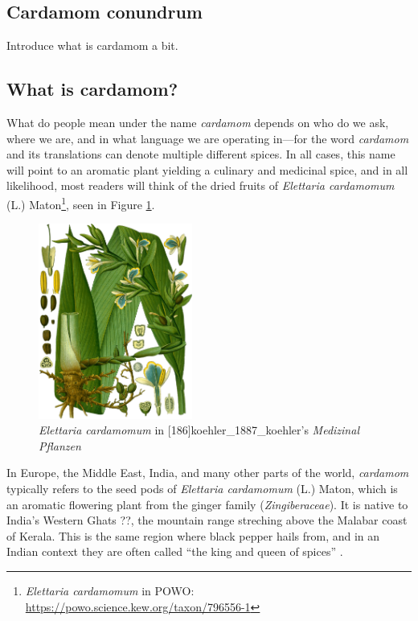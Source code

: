 \documentclass[12pt]{article}
\begin{document}
\subsection{Cardamom conundrum}

Introduce what is cardamom a bit.

\subsection{What is cardamom?}

What do people mean under the name \textit{cardamom} depends on who do we ask, where we are, and in what language we are operating in---for the word \textit{cardamom} and its translations can denote multiple different spices. In all cases, this name will point to an aromatic plant yielding a culinary and medicinal spice, and in all likelihood, most readers will think of the dried fruits of \textit{Elettaria cardamomum} (L.) Maton\footnote{\textit{Elettaria cardamomum} in POWO: \url{https://powo.science.kew.org/taxon/796556-1}}, seen in Figure \ref{fig:cardamom}.

\begin{figure}[!ht]
    \centering
    \includegraphics[width=0.45\textwidth]{../static/images/illustrations/cardamom.png}
    \caption{\textit{Elettaria cardamomum} in [186]{koehler_1887_koehler}'s \textit{Medizinal Pflanzen}}
    \label{fig:cardamom}
\end{figure}



In Europe, the Middle East, India, and many other parts of the world, \textit{cardamom} typically refers to the seed pods of \textit{Elettaria cardamomum} (L.) Maton, which is an aromatic flowering plant from the ginger family (\textit{Zingiberaceae}). It is native to India's Western Ghats ??, the mountain range streching above the Malabar coast of Kerala. This is the same region where black pepper hails from, and in an Indian context they are often called ``the king and queen of spices'' \parencite{nair_2020_geographya}. 
\end{document}
